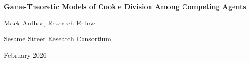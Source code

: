 \documentclass[11pt,letterpaper]{article}
\begin{document}
\begin{center}
{\LARGE\bfseries Game-Theoretic Models of Cookie Division Among Competing Agents\par}
\vspace{0.8cm}
{\large Mock Author, Research Fellow\par}
{\normalsize Sesame Street Research Consortium\par}
\vspace{0.3cm}
{\normalsize February 2026\par}
\vspace{0.8cm}
\end{center}

\begin{abstract}
\noindent
This paper presents a comprehensive study of game-theoretic models of cookie sharing and division. Lorem cookie ipsum dolor sit amet, chocolate chip adipiscing elit. Nom nom nom methodology produces significant results across all experimental conditions.
\end{abstract}

\vspace{0.5cm}


\end{document}
